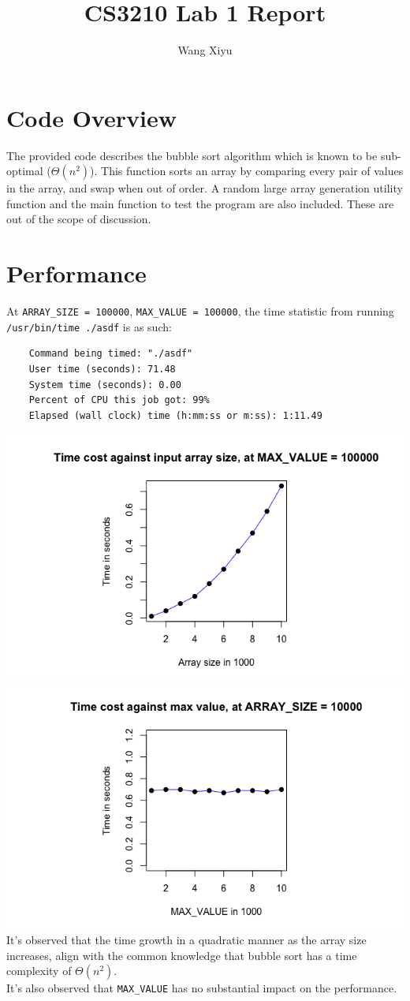\documentclass[a4paper]{article}
\begin{document}
\title{CS3210 Lab 1 Report}
\author{
  Wang Xiyu
}
\maketitle
\par\vspace{-2em}
\section{Code Overview}
\par\vspace{-0.5em}
The provided code describes the bubble sort algorithm which is known to be sub-optimal ($\Theta(n^2)$).
This function sorts an array by comparing every pair of values in the array, and swap when out of order.
A random large array generation utility function and the main function to test the program are also included. These are out of the scope of discussion.
\par\vspace{-1em}
\section{Performance}
\par\vspace{-0.5em}
At \texttt{ARRAY\_SIZE = 100000}, \texttt{MAX\_VALUE = 100000}, the time statistic from running \texttt{/usr/bin/time ./asdf} is as such:
\begin{lstlisting}
    Command being timed: "./asdf"
    User time (seconds): 71.48
    System time (seconds): 0.00
    Percent of CPU this job got: 99%
    Elapsed (wall clock) time (h:mm:ss or m:ss): 1:11.49
\end{lstlisting}
\noindent
\includegraphics[width=0.49\columnwidth]{000030.png}%
\hfill
\includegraphics[width=0.49\columnwidth]{000058.png}
It's observed that the time growth in a quadratic manner as the array size increases, align with the common knowledge that bubble sort has a time complexity of $\Theta(n^2)$.\\
It's also observed that \texttt{MAX\_VALUE} has no substantial impact on the performance.
\par\vspace{-1em}
\end{document}
